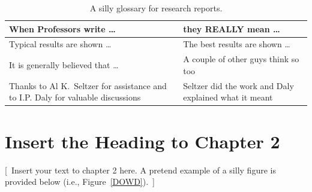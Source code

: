 \documentclass[12pt]{uthesis-v12}  %
\begin{document}
     \vfill
     \begin{table}[ht]
     \caption{A silly glossary for research reports.\label{SILLY}}
     \begin{center}
     \begin{tabular}{p{2.75in}|p{2.5in}}
      \rule[-0.5em]{0pt}{1.75em} \bf When Professors write \ldots
      & \bf they REALLY mean \ldots \\ \hline\hline
      \rule[-0.5em]{0pt}{1.75em} Typical results are shown \ldots
      & The best results are shown \ldots \\ \hline
      \rule[-0.5em]{0pt}{1.75em} It is generally believed that
      \ldots & A couple of other guys think so too  \\ \hline
      \rule[-0.5em]{0pt}{1.75em}Thanks to Al K.~Seltzer for
      assistance and to I.P. Daly for valuable discussions &
      Seltzer did the work and Daly explained
      what it meant \\
     \end{tabular}
     \end{center}
     \end{table}
     \vfill


\chapter{Insert the Heading to Chapter 2}

[~Insert your text to chapter 2 here. A pretend example of a silly
figure is provided below (i.e., Figure~\ref{DOWD}).~]

	 
\end{document}
